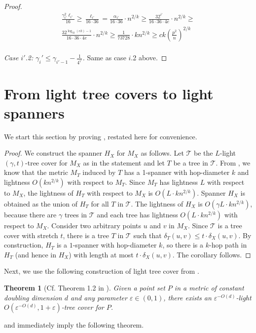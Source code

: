 \documentclass[11pt,english]{article}
\newcommand{\eps}{\varepsilon}
\newtheorem{theorem}{Theorem}[section]
\begin{document}
\begin{proof}
\begin{gather*}
\frac{\gamma_{i'}^2\ell_{i'}}{16}\ge 
\frac{\ell_{i'}}{16\cdot36}=
\frac{\alpha_{i'}}{16\cdot 36}\cdot n^{2/k}\ge
\frac{32^{i'}}{16\cdot 36\cdot 4e}\cdot n^{2/k}\ge\\
\frac{32^{\log_{32}(ek)-1}}{16\cdot 36\cdot 4e}\cdot n^{2/k}\ge
\frac{1}{73728}\cdot k n^{2/k}\ge
ck\left(\frac{p^2}{n}\right)^{2/k}
\end{gather*}\\

\noindent\textit{Case $i'$.2: $\gamma_i' \le \gamma_{i'-1}-\frac{1}{4^{i'}}$.} Same as case $i$.2 above.

\end{proof} \section{From light tree covers to light spanners}\label{sec:reduction}
We start this section by proving , restated here for convenience.
\reduction*
\begin{proof}
We construct the spanner $H_X$ for $M_X$ as follows. Let $\mathcal{T}$ be the $L$-light $(\gamma, t)$-tree cover for $M_X$ as in the statement and let $T$ be a tree in $\mathcal{T}$. From , we know that the metric $M_T$ induced by $T$ has a 1-spanner with hop-diameter $k$ and lightness $O(kn^{2/k})$ with respect to $M_T$. Since $M_T$ has lightness $L$ with respect to $M_X$, the lightness of $H_T$ with respect to $M_X$ is $O(L\cdot kn^{2/k})$. 
Spanner $H_X$ is obtained as the union of $H_T$ for all $T$ in $\mathcal{T}$. The lightness of $H_X$ is $O(\gamma L\cdot kn^{2/k})$, because there are $\gamma$ trees in $\mathcal{T}$ and each tree has lightness $O(L\cdot kn^{2/k})$ with respect to $M_X$. Consider two arbitrary points $u$ and $v$ in $M_X$. Since $\mathcal{T}$ is a tree cover with stretch $t$, there is a tree $T$ in $\mathcal{T}$ such that $\delta_T(u,v) \le t \cdot \delta_X(u,v)$. By construction, $H_T$ is a $1$-spanner with hop-diameter $k$, so there is a $k$-hop path in $H_T$ (and hence in $H_X$) with length at most $t \cdot \delta_X(u,v)$. The corollary follows.
\end{proof}

Next, we use the following construction of light tree cover from \cite{CCLST25}.
\begin{theorem}[Cf. Theorem 1.2 in \cite{CCLST25}]\label{st:light-doubling}
Given a point set $P$ in a metric of constant doubling dimension $d$ and any parameter
$\eps \in (0,1)$, there exists an $\eps^{-O(d)}$-light $O(\eps^{-O(d)}, 1+\eps)$-tree cover for $P$.
\end{theorem}
 and   immediately imply the following theorem.

\doubling*
 






\end{document}
